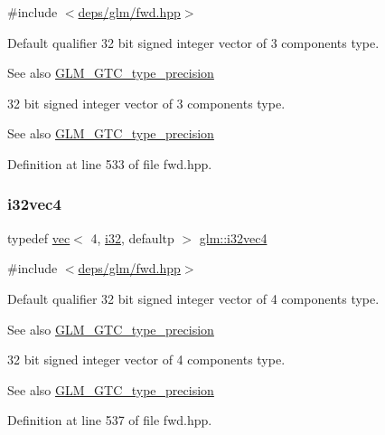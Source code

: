 {\ttfamily \#include $<$\hyperlink{fwd_8hpp}{deps/glm/fwd.\+hpp}$>$}

Default qualifier 32 bit signed integer vector of 3 components type. \begin{DoxySeeAlso}{See also}
\hyperlink{group__gtc__type__precision}{G\+L\+M\+\_\+\+G\+T\+C\+\_\+type\+\_\+precision}
\end{DoxySeeAlso}
32 bit signed integer vector of 3 components type. \begin{DoxySeeAlso}{See also}
\hyperlink{group__gtc__type__precision}{G\+L\+M\+\_\+\+G\+T\+C\+\_\+type\+\_\+precision} 
\end{DoxySeeAlso}


Definition at line 533 of file fwd.\+hpp.

\mbox{\label{group__gtc__type__precision_ga78c16dde5527264e8085b375efba6f28}} 
\subsubsection{\texorpdfstring{i32vec4}{i32vec4}}
{\footnotesize\ttfamily typedef \hyperlink{structglm_1_1vec}{vec}$<$ 4, \hyperlink{group__gtc__type__precision_ga1d8ed5c43e91ea7d4528389da4fa9524}{i32}, defaultp $>$ \hyperlink{group__gtc__type__precision_ga78c16dde5527264e8085b375efba6f28}{glm\+::i32vec4}}



{\ttfamily \#include $<$\hyperlink{fwd_8hpp}{deps/glm/fwd.\+hpp}$>$}

Default qualifier 32 bit signed integer vector of 4 components type. \begin{DoxySeeAlso}{See also}
\hyperlink{group__gtc__type__precision}{G\+L\+M\+\_\+\+G\+T\+C\+\_\+type\+\_\+precision}
\end{DoxySeeAlso}
32 bit signed integer vector of 4 components type. \begin{DoxySeeAlso}{See also}
\hyperlink{group__gtc__type__precision}{G\+L\+M\+\_\+\+G\+T\+C\+\_\+type\+\_\+precision} 
\end{DoxySeeAlso}


Definition at line 537 of file fwd.\+hpp.

\mbox{\label{group__gtc__type__precision_gac7a7eaad46064fc952b06df33689da23}} 
